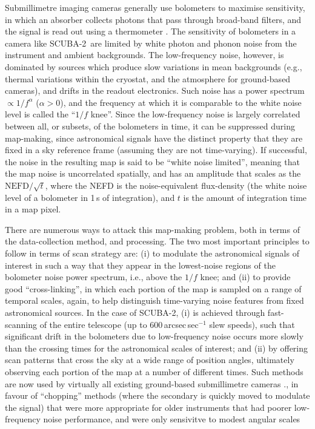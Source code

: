 \documentclass[useAMS,usenatbib,nofootinbib]{mn2e}
\newcommand{\scuba}{SCUBA-2}
\begin{document}
Submillimetre imaging cameras generally use bolometers to maximise
sensitivity, in which an absorber collects photons that pass through
broad-band filters, and the signal is read out using a thermometer
\citep[e.g.][]{griffin2002}. The sensitivity of bolometers in a camera
like \scuba\ are limited by white photon and phonon noise from the
instrument and ambient backgrounds. The low-frequency noise, however,
is dominated by sources which produce slow variations in mean backgrounds
(e.g., thermal variations within the cryostat, and the atmosphere for
ground-based cameras), and drifts in the readout electronics. Such
noise has a power spectrum $\propto 1/f^\alpha$ ($\alpha>0$), and the
frequency at which it is comparable to the white noise level is called
the ``$1/f$ knee''. Since the low-frequency noise is largely
correlated between all, or subsets, of the bolometers in time, it can
be suppressed during map-making, since astronomical signals have the
distinct property that they are fixed in a sky reference frame
(assuming they are not time-varying). If successful, the noise in the
resulting map is said to be ``white noise limited'', meaning that the
map noise is uncorrelated spatially, and has an amplitude that scales
as the $\mathrm{NEFD}/\sqrt{t}$, where the NEFD is the
noise-equivalent flux-density (the white noise level of a bolometer in
1\,s of integration), and $t$ is the amount of integration time in a
map pixel.

There are numerous ways to attack this map-making problem, both in
terms of the data-collection method, and processing. The two most
important principles to follow in terms of scan strategy are: (i) to
modulate the astronomical signals of interest in such a way that they
appear in the lowest-noise regions of the bolometer noise power
spectrum, i.e., above the $1/f$ knee; and (ii) to provide good
``cross-linking'', in which each portion of the map is sampled on a
range of temporal scales, again, to help distinguish time-varying
noise features from fixed astronomical sources. In the case of \scuba,
(i) is achieved through fast-scanning of the entire telescope (up to
600\,arcsec\,sec$^{-1}$ slew speeds), such that significant drift in
the bolometers due to low-frequency noise occurs more slowly than the
crossing times for the astronomical scales of interest; and (ii) by
offering scan patterns that cross the sky at a wide range of position
angles, ultimately observing each portion of the map at a number of
different times. Such methods are now used by virtually all existing
ground-based submillimetre cameras
\citep[e.g.][]{glenn1998,weferling2002,wilson2008,kovacs2008b}., in
favour of ``chopping'' methods (where the secondary is quickly moved
to modulate the signal) that were more appropriate for older
instruments that had poorer low-frequency noise performance, and were
only sensivitve to modest angular scales
\end{document}
